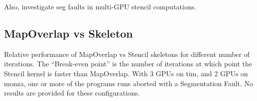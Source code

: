 Also, investigate seg faults in multi-GPU stencil computations.

\label{bibliography}
\printbibliography

\clearpage
\begin{appendices}
\section{MapOverlap vs Skeleton}\label{app:mo-vs-stencil}

Relative performance of MapOverlap vs Stencil skeletons for different
number of iterations. The ``Break-even point'' is the number of
iterations at which point the Stencil kernel is faster than
MapOverlap. With 3 GPUs on tim, and 2 GPUs on monza, one or more of
the programs runs aborted with a Segmentation Fault. No results are
provided for these configurations.

\begin{table}
\footnotesize
\centering

%
\end{table}

\end{appendices}


